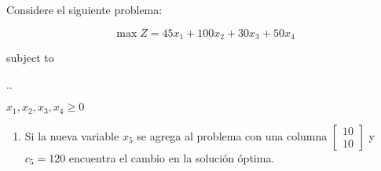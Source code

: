 \documentclass[spanish,letterpaper,11pt]{exam}
\author{Dr. Rafael Torres Escobar}
\begin{document}
\begin{questions}
    \question
Considere el siguiente problema:

    \[ \max Z = 45x_1 +100x_2 +30x_3 + 50x_4 \]

    {\centering
    subject to
    \vspace{2mm}
    
  \sysdelim..%

  \vspace{5mm}
  $x_1, x_2, x_3,x_4 \geq 0$    
  \par}

  \begin{enumerate}
    \item Si la nueva variable $x_5$ se agrega al problema con una columna $
    \begin{bmatrix}
      10\\10
    \end{bmatrix}
    $
    y $c_5 = 120$ encuentra el cambio en la solución óptima.    
  \end{enumerate}
\end{questions}
\end{document}
